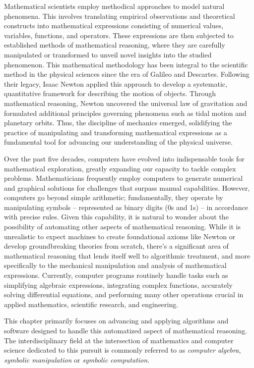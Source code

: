 Mathematical scientists employ methodical approaches to model natural phenomena. This involves translating empirical observations and theoretical constructs into mathematical expressions consisting of numerical values, variables, functions, and operators. These expressions are then subjected to established methods of mathematical reasoning, where they are carefully manipulated or transformed to unveil novel insights into the studied phenomenon. This mathematical methodology has been integral to the scientific method in the physical sciences since the era of Galileo and Descartes. Following their legacy, Isaac Newton applied this approach to develop a systematic, quantitative framework for describing the motion of objects. Through mathematical reasoning, Newton uncovered the universal law of gravitation and formulated additional principles governing phenomena such as tidal motion and planetary orbits. Thus, the discipline of mechanics emerged, solidifying the practice of manipulating and transforming mathematical expressions as a fundamental tool for advancing our understanding of the physical universe.

Over the past five decades, computers have evolved into indispensable tools for mathematical exploration, greatly expanding our capacity to tackle complex problems. Mathematicians frequently employ computers to generate numerical and graphical solutions for challenges that surpass manual capabilities. However, computers go beyond simple arithmetic; fundamentally, they operate by manipulating symbols -- represented as binary digits (0s and 1s) -- in accordance with precise rules. Given this capability, it is natural to wonder about the possibility of automating other aspects of mathematical reasoning. While it is unrealistic to expect machines to create foundational axioms like Newton or develop groundbreaking theories from scratch, there's a significant area of mathematical reasoning that lends itself well to algorithmic treatment, and more specifically to the mechanical manipulation and analysis of mathematical expressions. Currently, computer programs routinely handle tasks such as simplifying algebraic expressions, integrating complex functions, accurately solving differential equations, and performing many other operations crucial in applied mathematics, scientific research, and engineering.

This chapter primarily focuses on advancing and applying algorithms and software designed to handle this automatized aspect of mathematical reasoning. The interdisciplinary field at the intersection of mathematics and computer science dedicated to this pursuit is commonly referred to as \emph{computer algebra}, \emph{symbolic manipulation} or \emph{symbolic computation}.

